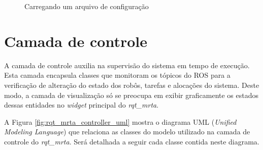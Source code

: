             \begin{figure}[htb]
                \centering
                \caption{Carregando um arquivo de configuração} \label{fig:opening_config}
            \end{figure}
        
    \section{Camada de controle} \label{subset:rqt_mrta_controller}
        A camada de controle auxilia na supervisão do sistema em tempo de execução. Esta camada encapsula classes que monitoram os tópicos do ROS para a verificação de alteração do estado dos robôs, tarefas e alocações do sistema. Deste modo, a camada de visualização só se preocupa em exibir graficamente os estados dessas entidades no \textit{widget} principal do \textit{rqt\_mrta}.
        
        A Figura \ref{fig:rqt_mrta_controller_uml} mostra o diagrama UML (\textit{Unified Modeling Language}) que relaciona as classes do modelo utilizado na camada de controle do \textit{rqt\_mrta}. Será detalhada a seguir cada classe contida neste diagrama.
        
